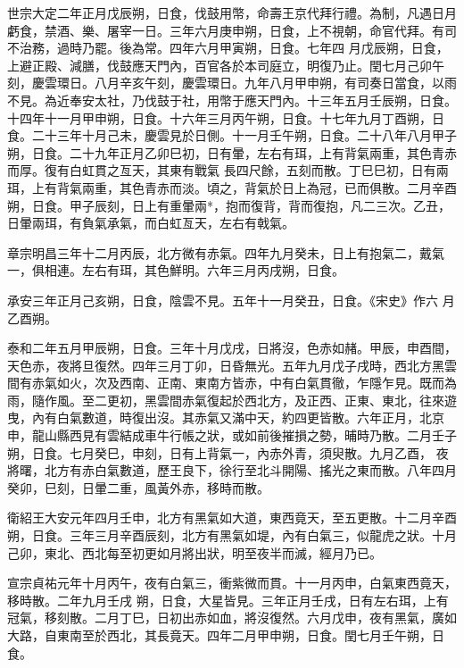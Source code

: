 \begin{pinyinscope}
 世宗大定二年正月戊辰朔，日食，伐鼓用幣，命壽王京代拜行禮。為制，凡遇日月虧食，禁酒、樂、屠宰一日。三年六月庚申朔，日食，上不視朝，命官代拜。有司不治務，過時乃罷。後為常。四年六月甲寅朔，日食。七年四
 月戊辰朔，日食，上避正殿、減膳，伐鼓應天門內，百官各於本司庭立，明復乃止。閏七月己卯午刻，慶雲環日。八月辛亥午刻，慶雲環日。九年八月甲申朔，有司奏日當食，以雨不見。為近奉安太社，乃伐鼓于社，用幣于應天門內。十三年五月壬辰朔，日食。十四年十一月甲申朔，日食。十六年三月丙午朔，日食。十七年九月丁酉朔，日食。二十三年十月己未，慶雲見於日側。十一月壬午朔，日食。二十八年八月甲子朔，日食。二十九年正月乙卯巳初，日有暈，左右有珥，上有背氣兩重，其色青赤而厚。復有白虹貫之亙天，其東有戰氣
 長四尺餘，五刻而散。丁巳巳初，日有兩珥，上有背氣兩重，其色青赤而淡。頃之，背氣於日上為冠，已而俱散。二月辛酉朔，日食。甲子辰刻，日上有重暈兩*，抱而復背，背而復抱，凡二三次。乙丑，日暈兩珥，有負氣承氣，而白虹亙天，左右有戟氣。



 章宗明昌三年十二月丙辰，北方微有赤氣。四年九月癸未，日上有抱氣二，戴氣一，俱相連。左右有珥，其色鮮明。六年三月丙戌朔，日食。



 承安三年正月己亥朔，日食，陰雲不見。五年十一月癸丑，日食。《宋史》作六
 月乙酉朔。



 泰和二年五月甲辰朔，日食。三年十月戊戌，日將沒，色赤如赭。甲辰，申酉間，天色赤，夜將旦復然。四年三月丁卯，日昏無光。五年九月戊子戌時，西北方黑雲間有赤氣如火，次及西南、正南、東南方皆赤，中有白氣貫徹，乍隱乍見。既而為雨，隨作風。至二更初，黑雲間赤氣復起於西北方，及正西、正東、東北，往來遊曳，內有白氣數道，時復出沒。其赤氣又滿中天，約四更皆散。六年正月，北京申，龍山縣西見有雲結成車牛行帳之狀，或如前後摧損之勢，晡時乃散。二月壬子朔，日食。七月癸巳，申刻，日有上背氣一，內赤外青，須臾散。九月乙酉，
 夜將曙，北方有赤白氣數道，歷王良下，徐行至北斗開陽、搖光之東而散。八年四月癸卯，巳刻，日暈二重，風黃外赤，移時而散。



 衛紹王大安元年四月壬申，北方有黑氣如大道，東西竟天，至五更散。十二月辛酉朔，日食。三年三月辛酉辰刻，北方有黑氣如堤，內有白氣三，似龍虎之狀。十月己卯，東北、西北每至初更如月將出狀，明至夜半而滅，經月乃已。



 宣宗貞祐元年十月丙午，夜有白氣三，衝紫微而貫。十一月丙申，白氣東西竟天，移時散。二年九月壬戌
 朔，日食，大星皆見。三年正月壬戌，日有左右珥，上有冠氣，移刻散。二月丁巳，日初出赤如血，將沒復然。六月戊申，夜有黑氣，廣如大路，自東南至於西北，其長竟天。四年二月甲申朔，日食。閏七月壬午朔，日食。




\end{pinyinscope}
